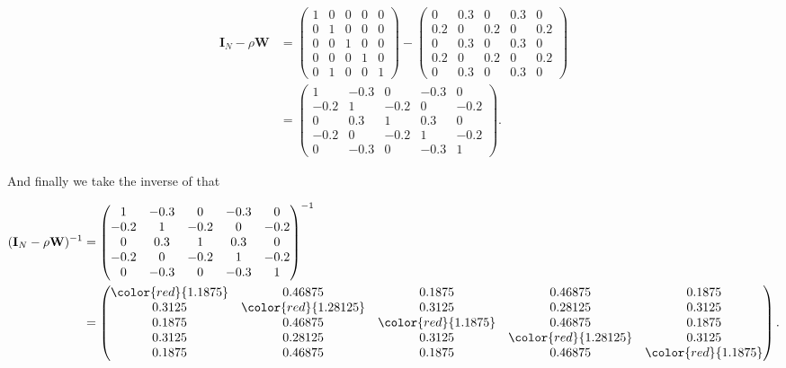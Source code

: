 \documentclass[
  letterpaper,
]{scrbook}
\begin{document}
\[
\begin{split}
\boldsymbol{\mathbf{I}}_N - \rho \boldsymbol{\mathbf{W}} &=
\begin{pmatrix}
      1 & 0 & 0 & 0 & 0 \\
      0 & 1 & 0 & 0 & 0 \\
      0 & 0 & 1 & 0 & 0 \\
      0 & 0 & 0 & 1 & 0 \\
      0 & 1 & 0 & 0 & 1
      \end{pmatrix} - 
\begin{pmatrix}
      0 & 0.3 & 0 & 0.3 & 0 \\
      0.2 & 0 & 0.2 & 0 & 0.2 \\
      0 & 0.3 & 0 & 0.3 & 0 \\
      0.2 & 0 & 0.2 & 0 & 0.2 \\
      0 & 0.3 & 0 & 0.3 & 0
      \end{pmatrix}\\
& = \begin{pmatrix}
      1 & -0.3 & 0 & -0.3 & 0 \\
      -0.2 & 1 & -0.2 & 0 & -0.2 \\
      0 & 0.3 & 1 & 0.3 & 0 \\
      -0.2 & 0 & -0.2 & 1 & -0.2 \\
      0 & -0.3 & 0 & -0.3 & 1
      \end{pmatrix}.
\end{split}
\]

And finally we take the inverse of that

\[
\begin{split}
(\boldsymbol{\mathbf{I}}_N - \rho \boldsymbol{\mathbf{W}})^{-1} &=
\begin{pmatrix}
      1 & -0.3 & 0 & -0.3 & 0 \\
      -0.2 & 1 & -0.2 & 0 & -0.2 \\
      0 & 0.3 & 1 & 0.3 & 0 \\
      -0.2 & 0 & -0.2 & 1 & -0.2 \\
      0 & -0.3 & 0 & -0.3 & 1
      \end{pmatrix}^{-1}\\
&=
\begin{pmatrix}
      \color{red}{1.1875} & 0.46875 & 0.1875 & 0.46875 & 0.1875 \\
      0.3125 & \color{red}{1.28125} & 0.3125 & 0.28125 & 0.3125 \\
      0.1875 & 0.46875 & \color{red}{1.1875} & 0.46875 & 0.1875 \\
      0.3125 & 0.28125 & 0.3125 & \color{red}{1.28125} & 0.3125 \\
      0.1875 & 0.46875 & 0.1875 & 0.46875 & \color{red}{1.1875}
      \end{pmatrix}.
\end{split}
\]
\end{document}
